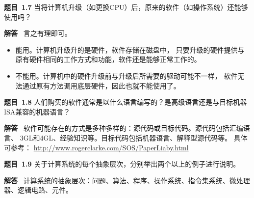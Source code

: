 \documentclass[10pt,a4paper,UTF8]{ctexart}
\newcommand{\problemname}{待定义}
\newenvironment{problem}{\begin{shaded}\par\noindent\textbf{题目\  \problemname}}{\end{shaded}\par}
\newenvironment{solution}{\par\noindent\textbf{解答}\ }{\par}
\begin{document}
\renewcommand{\problemname}{1.7}
\begin{problem}
	当将计算机升级（如更换CPU）后，原来的软件（如操作系统）还能够使用吗？
\end{problem}

\begin{solution}
	言之有理即可。
	\begin{itemize}
		\item 能用。计算机升级升的是硬件，软件存储在磁盘中，
		只要升级的硬件提供与原有硬件相同的工作方式和功能，软件还是能够正常工作的。
		\item 不能用。计算机中的硬件升级前与升级后所需要的驱动可能不一样，
		软件无法通过原有方法调用底层硬件，因此也就不能使用了。
	\end{itemize}
\end{solution}


\renewcommand{\problemname}{1.8}
\begin{problem}
	人们购买的软件通常是以什么语言编写的？是高级语言还是与目标机器ISA兼容的机器语言？
\end{problem}

\begin{solution}
	软件可能存在的方式是多种多样的：源代码或目标代码。源代码包括汇编语言、
	3GL和4GL、经验知识等。目标代码包括机器语言、解释型源代码等。
	具体可参考：
	\href{http://www.rogerclarke.com/SOS/PaperLiaby.html}{http://www.rogerclarke.com/SOS/PaperLiaby.html}
\end{solution}


\renewcommand{\problemname}{1.9}
\begin{problem}
	关于计算系统的每个抽象层次，分别举出两个以上的例子进行说明。
\end{problem}

\begin{solution}
	计算系统的抽象层次：问题、算法、程序、操作系统、指令集系统、微处理器、逻辑电路、元件。
\end{solution}
\end{document}
